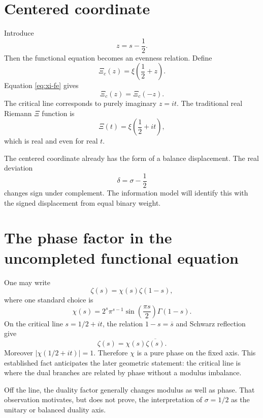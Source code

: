 \section{Centered coordinate}
Introduce
\begin{equation}
z=s-\frac12.
\end{equation}
Then the functional equation becomes an evenness relation. Define
\begin{equation}
\Xi_c(z)=\xi\!\left(\frac12+z\right).
\end{equation}
Equation \eqref{eq:xi-fe} gives
\begin{equation}
\Xi_c(z)=\Xi_c(-z).
\end{equation}
The critical line corresponds to purely imaginary $z=it$. The traditional real Riemann $\Xi$ function is
\begin{equation}
\Xi(t)=\xi\!\left(\frac12+it\right),
\end{equation}
which is real and even for real $t$.

The centered coordinate already has the form of a balance displacement. The real deviation
\begin{equation}
\delta=\sigma-\frac12
\end{equation}
changes sign under complement. The information model will identify this with the signed displacement from equal binary weight.

\section{The phase factor in the uncompleted functional equation}
One may write
\begin{equation}
\zeta(s)=\chi(s)\zeta(1-s),
\end{equation}
where one standard choice is
\begin{equation}
\chi(s)=2^s\pi^{s-1}\sin\!\left(\frac{\pi s}{2}\right)\Gamma(1-s).
\end{equation}
On the critical line $s=1/2+it$, the relation $1-s=\overline{s}$ and Schwarz reflection give
\begin{equation}
\zeta(s)=\chi(s)\overline{\zeta(s)}.
\end{equation}
Moreover $|\chi(1/2+it)|=1$. Therefore $\chi$ is a pure phase on the fixed axis. This established fact anticipates the later geometric statement: the critical line is where the dual branches are related by phase without a modulus imbalance.

Off the line, the duality factor generally changes modulus as well as phase. That observation motivates, but does not prove, the interpretation of $\sigma=1/2$ as the unitary or balanced duality axis.
